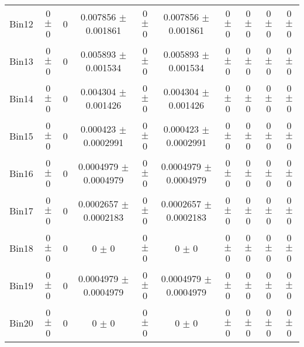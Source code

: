 \begin{tabular}{@{\extracolsep{4pt}}lccccccccc@{}}
     Bin12 & 0 $\pm$ 0 & 0 & 0.007856 $\pm$ 0.001861 & 0 $\pm$ 0 & 0.007856 $\pm$ 0.001861 & 0 $\pm$ 0 & 0 $\pm$ 0 & 0 $\pm$ 0 & 0 $\pm$ 0 \\ 
     Bin13 & 0 $\pm$ 0 & 0 & 0.005893 $\pm$ 0.001534 & 0 $\pm$ 0 & 0.005893 $\pm$ 0.001534 & 0 $\pm$ 0 & 0 $\pm$ 0 & 0 $\pm$ 0 & 0 $\pm$ 0 \\ 
     Bin14 & 0 $\pm$ 0 & 0 & 0.004304 $\pm$ 0.001426 & 0 $\pm$ 0 & 0.004304 $\pm$ 0.001426 & 0 $\pm$ 0 & 0 $\pm$ 0 & 0 $\pm$ 0 & 0 $\pm$ 0 \\ 
     Bin15 & 0 $\pm$ 0 & 0 & 0.000423 $\pm$ 0.0002991 & 0 $\pm$ 0 & 0.000423 $\pm$ 0.0002991 & 0 $\pm$ 0 & 0 $\pm$ 0 & 0 $\pm$ 0 & 0 $\pm$ 0 \\ 
     Bin16 & 0 $\pm$ 0 & 0 & 0.0004979 $\pm$ 0.0004979 & 0 $\pm$ 0 & 0.0004979 $\pm$ 0.0004979 & 0 $\pm$ 0 & 0 $\pm$ 0 & 0 $\pm$ 0 & 0 $\pm$ 0 \\ 
     Bin17 & 0 $\pm$ 0 & 0 & 0.0002657 $\pm$ 0.0002183 & 0 $\pm$ 0 & 0.0002657 $\pm$ 0.0002183 & 0 $\pm$ 0 & 0 $\pm$ 0 & 0 $\pm$ 0 & 0 $\pm$ 0 \\ 
     Bin18 & 0 $\pm$ 0 & 0 & 0 $\pm$ 0 & 0 $\pm$ 0 & 0 $\pm$ 0 & 0 $\pm$ 0 & 0 $\pm$ 0 & 0 $\pm$ 0 & 0 $\pm$ 0 \\ 
     Bin19 & 0 $\pm$ 0 & 0 & 0.0004979 $\pm$ 0.0004979 & 0 $\pm$ 0 & 0.0004979 $\pm$ 0.0004979 & 0 $\pm$ 0 & 0 $\pm$ 0 & 0 $\pm$ 0 & 0 $\pm$ 0 \\ 
     Bin20 & 0 $\pm$ 0 & 0 & 0 $\pm$ 0 & 0 $\pm$ 0 & 0 $\pm$ 0 & 0 $\pm$ 0 & 0 $\pm$ 0 & 0 $\pm$ 0 & 0 $\pm$ 0 \\ 
\hline\hline
  \end{tabular}
